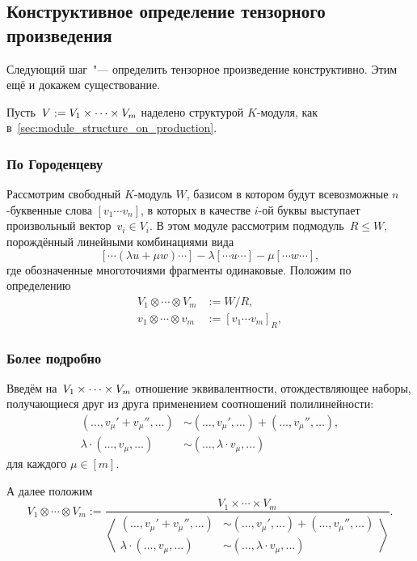 
\subsection{Конструктивное определение тензорного произведения}

Следующий шаг~"--- определить тензорное произведение конструктивно. Этим ещё и докажем существование.

Пусть~$V := V_1 \times\cdots\times V_m$ наделено структурой $K$-модуля, как в~\cref{sec:module_structure_on_production}.

\subsubsection{По Городенцеву}

Рассмотрим свободный $K$-модуль $W$, базисом в котором будут всевозможные $n$-буквенные слова $[v_1 \cdots v_n]$, в которых в качестве $i$-ой буквы выступает произвольный вектор~$v_i \in V_i$. В этом модуле рассмотрим подмодуль~$R \leq W$, порождённый линейными комбинациями вида
\[
	[\cdots (\lambda u + \mu w) \cdots]
	-
	\lambda [\cdots u \cdots]
	-
	\mu [\cdots w \cdots]
	,
\]
где обозначенные многоточиями фрагменты одинаковые. Положим по определению
\begin{align*}
	V_1 \otimes \cdots \otimes V_m &:= W / R,
	\\
	v_1 \otimes \cdots \otimes v_m &:= [v_1 \cdots v_m]_{R},
\end{align*}

\subsubsection{Более подробно}

Введём на~$V_1 \times\cdots\times V_m$ отношение эквивалентности, отождествляющее наборы, получающиеся друг из друга применением соотношений полилинейности:
\begin{align}
	(\dots, v_\mu' + v_\mu'', \dots)
	&\sim
	(\dots, v_\mu', \dots) +
	(\dots, v_\mu'', \dots),
	\label{eq:tensor_prod:polylinearity:additivity}
	\\
	\lambda \cdot
	(\dots, v_\mu, \dots)
	&\sim
	(\dots, \lambda \cdot v_\mu, \dots)
	\label{eq:tensor_prod:polylinearity:lambda}
\end{align}
для каждого $\mu \in [m]$.

А далее положим
\[
	V_1 \otimes \cdots \otimes V_m
	:=
	\frac{
		V_1 \times \cdots \times V_m
	}{
		\left<
			\begin{aligned}
				(\dots, v_\mu' + v_\mu'', \dots)
				&\sim
				(\dots, v_\mu', \dots) +
				(\dots, v_\mu'', \dots)%
				\\
				\lambda \cdot
				(\dots, v_\mu, \dots)
				&\sim
				(\dots, \lambda \cdot v_\mu, \dots)
			\end{aligned}
		\right>
	}
	.
\]

